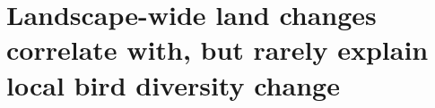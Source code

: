 \chapter{Landscape-wide land changes correlate with, but rarely explain local bird diversity change}
